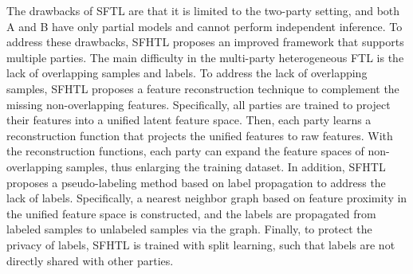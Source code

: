\documentclass[11pt]{article}
\begin{document}
The drawbacks of SFTL are that it is limited to the two-party setting, and both A and B have only partial models and cannot perform independent inference. To address these drawbacks, SFHTL \cite{Yilun-feng2022semi} proposes an improved framework that supports multiple parties. The main difficulty in the multi-party heterogeneous FTL is the lack of overlapping samples and labels. To address the lack of overlapping samples, SFHTL proposes a feature reconstruction technique to complement the missing non-overlapping features. Specifically, all parties are trained to project their features into a unified latent feature space. Then, each party learns a reconstruction function that projects the unified features to raw features. With the reconstruction functions, each party can expand the feature spaces of non-overlapping samples, thus enlarging the training dataset. In addition, SFHTL proposes a pseudo-labeling method based on label propagation \cite{Yilun-zhu2005semi} to address the lack of labels. Specifically, a nearest neighbor graph based on feature proximity in the unified feature space is constructed, and the labels are propagated from labeled samples to unlabeled samples via the graph. Finally, to protect the privacy of labels, SFHTL is trained with split learning, such that labels are not directly shared with other parties.
\end{document}

